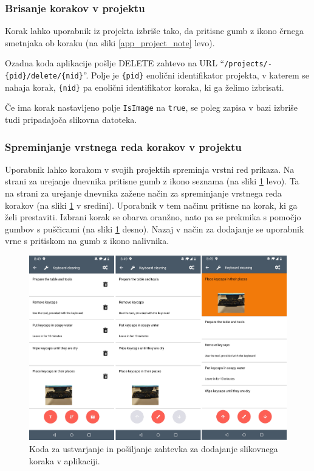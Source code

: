 \documentclass[a4paper, 12pt]{book}
\begin{document}
\subsubsection{Brisanje korakov v projektu}

Korak lahko uporabnik iz projekta izbriše tako, da pritisne gumb z ikono črnega smetnjaka ob koraku (na sliki \ref{app_project_note} levo).

Ozadna koda aplikacije pošlje DELETE zahtevo na URL \enquote{\texttt{/projects/-\\\{pid\}/delete/\{nid\}}}.
Polje je \texttt{\{pid\}} enolični identifikator projekta, v katerem se nahaja korak, \texttt{\{nid\}} pa enolični identifikator koraka, ki ga želimo izbrisati.

Če ima korak nastavljeno polje \texttt{IsImage} na \texttt{true}, se poleg zapisa v bazi izbriše tudi pripadajoča slikovna datoteka.



\subsubsection{Spreminjanje vrstnega reda korakov v projektu}

Uporabnik lahko korakom v svojih projektih spreminja vrstni red prikaza.
Na strani za urejanje dnevnika pritisne gumb z ikono seznama (na sliki \ref{app_ordering} levo).
Ta na strani za urejanje dnevnika zažene način za spreminjanje vrstnega reda korakov (na sliki \ref{app_ordering} v sredini).
Uporabnik v tem načinu pritisne na korak, ki ga želi prestaviti.
Izbrani korak se obarva oranžno, nato pa se prekmika s pomočjo gumbov s puščicami (na sliki \ref{app_ordering} desno).
Nazaj v način za dodajanje se uporabnik vrne s pritiskom na gumb z ikono nalivnika.

\begin{figure}[H]
\begin{center}
	\includegraphics[width=13.5cm]{app_ordering}
\end{center}
	\caption{Koda za ustvarjanje in pošiljanje zahtevka za dodajanje slikovnega koraka v aplikaciji.}
\label{app_ordering}
\end{figure}
\end{document}

